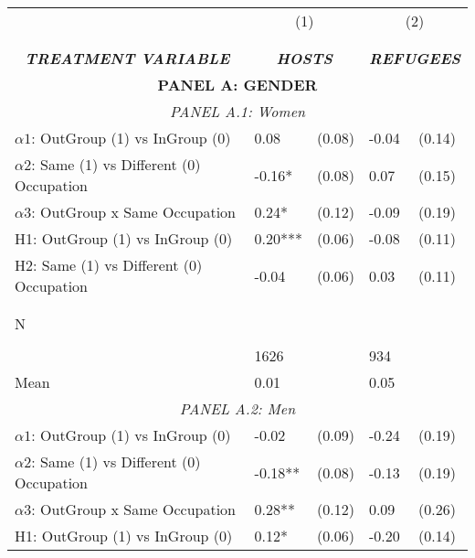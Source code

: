 \begin{tabular}{l*{4}{l}} \toprule 
                &\multicolumn{2}{c}{(1)}&\multicolumn{2}{c}{(2)}\\
                &\multicolumn{2}{c}{ } &\multicolumn{2}{c}{ } \\
\\[-0.6cm] \multicolumn{1}{c}{\textit{\textbf{TREATMENT VARIABLE}}} & \multicolumn{2}{c}{\textit{\textbf{HOSTS}}} & \multicolumn{2}{c}{\textit{\textbf{REFUGEES}}} \\ \midrule   \multicolumn{5}{c}{\textbf{PANEL A: GENDER}} \\ \multicolumn{5}{c}{\textit{PANEL A.1: Women}} \\  \midrule  
$\alpha1$: OutGroup (1) vs InGroup (0)&     0.08   &   (0.08)&    -0.04   &   (0.14)\\
$\alpha2$: Same (1) vs Different (0) Occupation&    -0.16*  &   (0.08)&     0.07   &   (0.15)\\
 
$\alpha3$: OutGroup x Same Occupation&     0.24*  &   (0.12)&    -0.09   &   (0.19)\\
 
H1: OutGroup (1) vs InGroup (0)&     0.20***&   (0.06)&    -0.08   &   (0.11)\\
 
H2: Same (1) vs Different (0) Occupation&    -0.04   &   (0.06)&     0.03   &   (0.11)\\
 
  \\\\[-0.5cm] N \\\\[-0.6cm]&     1626   &         &      934   &         \\
Mean            &     0.01&         &     0.05&         \\
 
  \multicolumn{5}{c}{\textit{PANEL A.2: Men}} \\  \midrule  
$\alpha1$: OutGroup (1) vs InGroup (0)&       -0.02   &      (0.09)&       -0.24   &      (0.19)\\
$\alpha2$: Same (1) vs Different (0) Occupation&       -0.18** &      (0.08)&       -0.13   &      (0.19)\\
 
$\alpha3$: OutGroup x Same Occupation&     0.28** &   (0.12)&     0.09   &   (0.26)\\
 
H1: OutGroup (1) vs InGroup (0)&     0.12*  &   (0.06)&    -0.20   &   (0.14)\\
 

\end{tabular}
